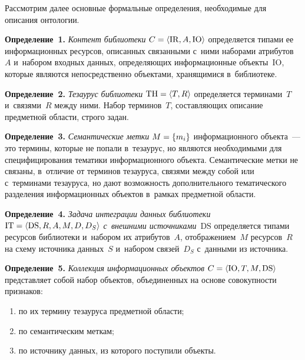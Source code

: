 \begin{multicols}{2}
     Рассмотрим далее основные формальные определения, необходимые 
для описания онтологии.
     
     \smallskip
     
     \noindent
\textbf{Определение~1.} \textit{Контент библиотеки} $C\hm=\langle \mathrm{IR}, A, 
\mathrm{IO}\rangle$ определяется типами ее информационных ресурсов, описанных 
связанными с~ними наборами атрибутов~$A$ и~набором входных данных, 
опре\-де\-ля\-ющих информационные объекты~$\mathrm{IO}$, которые являются 
непосредственно объектами, хранящимися в~биб\-лио\-теке.
\smallskip

\noindent
\textbf{Определение~2.} \textit{Тезаурус библиотеки} $\mathrm{TH}\hm=\langle T, 
R\rangle$ определяется терминами~$T$ и~связями~$R$ между ними. Набор 
терминов~$T$, со\-став\-ля\-ющих описание предметной об\-ласти, строго задан.

\smallskip

\noindent
\textbf{Определение~3.} \textit{Семантические метки} $M\hm=\left\{ 
m_i\right\}$ информационного объекта~--- это термины, которые не попали 
в~тезаурус, но являются необходимыми для специфицирования тематики 
информационного объекта. Семантические метки не связаны, в~отличие от 
терминов тезауруса, связями между собой или с~терминами тезауруса, но 
дают возможность дополнительного тематического разделения 
информационных объектов в~рамках предметной об\-ласти.

\smallskip

\noindent
\textbf{Определение~4.} \textit{Задача интеграции данных биб\-лио\-те\-ки} 
$\mathrm{IT}\hm = \langle \mathrm{DS}, R, A, M, D, D_S\rangle$ \textit{с~внешними 
источниками}~$\mathrm{DS}$ определяется типами ресурсов биб\-лио\-те\-ки и~набором 
их атрибутов~$A$, отображением~$M$ ресурсов~$R$ на схему источника 
данных~$S$ и~набором связей~$D_S$ с~данными из источника.

\smallskip

\noindent
\textbf{Определение~5.} \textit{Коллекция информационных объектов} 
$C\hm= \langle \mathrm{IO}, T, M, \mathrm{DS}\rangle$ представляет собой набор объектов, 
объединенных на основе совокупности признаков:
\begin{enumerate}[(1)]
\item по их термину тезауруса предметной об\-ласти; 
\item по семантическим меткам; 
\item по источнику данных, из которого поступили объекты.
\end{enumerate}


\end{multicols}

